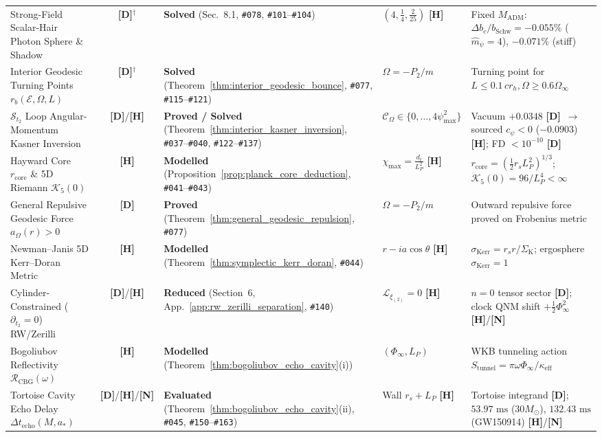 \documentclass[11pt,a4paper]{article}
\newcommand{\catD}{\textbf{\textcolor{blue!75!black}{[D]}}}
\newcommand{\catH}{\textbf{\textcolor{orange!85!black}{[H]}}}
\newcommand{\catN}{\textbf{\textcolor{teal!75!black}{[N]}}}
\theoremstyle{plain}
\theoremstyle{definition}
\theoremstyle{remark}
\numberwithin{equation}{section}
\begin{document}
\begin{table}[H]
\begin{tabularx}{\textwidth}{@{} L{0.25\textwidth} c L{0.19\textwidth} L{0.15\textwidth} Y @{}}
    Strong-Field Scalar-Hair Photon Sphere \& Shadow & \catD$^{\dagger}$ & \textbf{Solved} (Sec.~8.1, \texttt{\#078}, \texttt{\#101}--\texttt{\#104}) & $(4, \frac{1}{4}, \frac{2}{25})$ \catH & Fixed $M_{\text{ADM}}$: $\Delta b_c/b_{\text{Schw}} = -0.055\%$ ($\hat{m}_{\psi}=4$), $-0.071\%$ (stiff) \\
    Interior Geodesic Turning Points $r_b(\mathcal{E},\Omega,L)$ & \catD$^{\dagger}$ & \textbf{Solved} (Theorem~\ref{thm:interior_geodesic_bounce}, \texttt{\#077}, \texttt{\#115}--\texttt{\#121}) & $\Omega = -P_2/m$ & Turning point for $L \le 0.1\,c r_h, \Omega \ge 0.6\Omega_{\infty}$ \\
    $\mathcal{S}_{t_2}$ Loop Angular-Momentum Kasner Inversion & \catD/\catH & \textbf{Proved / Solved} (Theorem~\ref{thm:interior_kasner_inversion}, \texttt{\#037}--\texttt{\#040}, \texttt{\#122}--\texttt{\#137}) & $\mathcal{C}_{\Omega} \in \{0,\dots,4\psi_{\max}^2\}$ & Vacuum $+0.0348$ \catD\ $\to$ sourced $c_{\psi} < 0$ ($-0.0903$) \catH; FD $< 10^{-10}$ \catD \\
    Hayward Core $r_{\text{core}}$ \& 5D Riemann $\mathcal{K}_5(0)$ & \catH & \textbf{Modelled} (Proposition~\ref{prop:planck_core_deduction}, \texttt{\#041}--\texttt{\#043}) & $\chi_{\max}=\frac{d_t}{L_P^2}$ \catH & $r_{\text{core}} = (\frac{1}{2}r_s L_P^2)^{1/3}$; $\mathcal{K}_5(0) = 96/L_P^4 < \infty$ \\
    General Repulsive Geodesic Force $a_{\Omega}(r) > 0$ & \catD & \textbf{Proved} (Theorem~\ref{thm:general_geodesic_repulsion}, \texttt{\#077}) & $\Omega = -P_2/m$ & Outward repulsive force proved on Frobenius metric \\
    Newman--Janis 5D Kerr--Doran Metric & \catH & \textbf{Modelled} (Theorem~\ref{thm:symplectic_kerr_doran}, \texttt{\#044}) & $r - ia\cos\theta$ \catH & $\sigma_{\text{Kerr}} = r_s r/\Sigma_{\text{K}}$; ergosphere $\sigma_{\text{Kerr}}=1$ \\
    Cylinder-Constrained ($\partial_{t_2}=0$) RW/Zerilli & \catD/\catH & \textbf{Reduced} (Section~6, App.~\ref{app:rw_zerilli_separation}, \texttt{\#140}) & $\mathcal{L}_{\xi_{(2)}} = 0$ \catH & $n=0$ tensor sector \catD; clock QNM shift $+\frac{1}{2}\Phi_{\infty}^2$ \catH/\catN \\
    Bogoliubov Reflectivity $\mathcal{R}_{\text{CBG}}(\omega)$ & \catH & \textbf{Modelled} (Theorem~\ref{thm:bogoliubov_echo_cavity}(i)) & $(\Phi_{\infty}, L_P)$ & WKB tunneling action $S_{\text{tunnel}} = \pi\omega\Phi_{\infty}/\kappa_{\text{eff}}$ \\
    Tortoise Cavity Echo Delay $\Delta t_{\text{echo}}(M, a_*)$ & \catD/\catH/\catN & \textbf{Evaluated} (Theorem~\ref{thm:bogoliubov_echo_cavity}(ii), \texttt{\#045}, \texttt{\#150}--\texttt{\#163}) & Wall $r_s + L_P$ \catH & Tortoise integrand \catD; $53.97\text{ ms}$ ($30 M_{\odot}$), $132.43\text{ ms}$ (GW150914) \catH/\catN \\

\end{tabularx}
\end{table}
\end{document}
